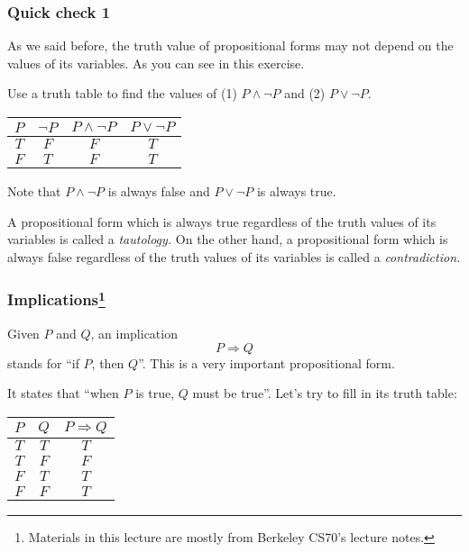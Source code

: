 \begin{frame}\frametitle{Quick check 1}
  As we said before, the truth value of propositional forms may not
  depend on the values of its variables.  As you can see in this
  exercise.
  
  Use a truth table to find the values of (1) $P\wedge \neg P$ and (2)
  $P\vee\neg P$.
  \pause

  \begin{tcolorbox}[title=And/Or/Not]
    \begin{tabular}{|c|c||c|c|}
      \hline
      $P$ & $\neg P$ & $P\wedge\neg P$ & $P\vee\neg P$\\
      \hline
      $T$ & $F$ & $F$ & $T$ \\
      $F$ & $T$ & $F$ & $T$ \\
      \hline
    \end{tabular}
  \end{tcolorbox}
  \pause

  Note that $P\wedge\neg P$ is always false and $P\vee\neg P$ is always true.

  A propositional form which is always true regardless of the truth
  values of its variables is called a {\em tautology.}  On the other
  hand, a propositional form which is always false regardless of the
  truth values of its variables is called a {\em contradiction.}
\end{frame}

\begin{frame}\frametitle{Implications\footnote{Materials in this lecture are mostly from Berkeley CS70's lecture notes.}}
  Given $P$ and $Q$, an implication
  \[P\Rightarrow Q\]
  stands for ``if $P$, then $Q$''.  This is a very important
  propositional form.

  It states that ``when $P$ is true, $Q$ must be true''.  Let's try to
  fill in its truth table:

  \begin{tcolorbox}[title=Implications]
    \begin{tabular}{|c|c||c|}
      \hline
      $P$ & $Q$ & $P\Rightarrow Q$ \\
      \hline
      $T$ & $T$ & \pause $T$ \\
      $T$ & $F$ & \pause $F$ \\
      $F$ & $T$ & \pause $T$ \\
      $F$ & $F$ & \pause $T$ \\
      \hline
    \end{tabular}
  \end{tcolorbox}
\end{frame}

